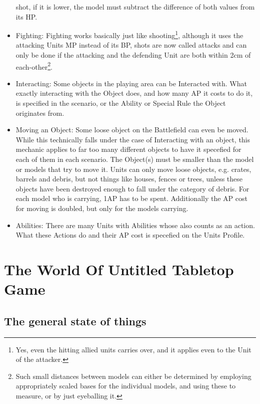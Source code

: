 \documentclass[a4paper,12pt]{report}
\begin{document}
\begin{adjustwidth}{-2cm}{-2cm}
\begin{multicols}{2}
\begin{itemize}
shot, if it is lower, the model must subtract the difference of both values from its HP. 
	\item Fighting: Fighting works basically just like shooting\footnote{Yes, even the hitting allied units carries over, and it applies even to the Unit of the attacker.}, although it uses the attacking Units MP instead of its BP, shots are now called attacks and can only be done if the attacking and the defending Unit are both within 2cm of each-other\footnote{Such small distances between models can either be determined by employing appropriately scaled bases for the individual models, and using these to measure, or by just eyeballing it.}. 
	\item Interacting: Some objects in the playing area can be Interacted with. What exactly interacting with the Object does, and how many AP it costs to do it, is specified in the scenario, or the Ability or Special Rule the Object originates from.
	\item Moving an Object: Some loose object on the Battlefield can even be moved. While this technically falls under the case of Interacting with an object, this mechanic applies to far too many different objects to have it specefied for each of them in each scenario. The Object(s) must be smaller than the model or models that try to move it.  Units can only move loose objects, e.g. crates, barrels and debris, but not things like houses, fences or trees, unless these objects have been destroyed enough to fall under the category of debris.  For each model who is carrying, 1AP has to be spent. Additionally the AP cost for moving is doubled, but only for the models carrying.
	\item Abilities: There are many Units with Abilities whose also counts as an action. What these Actions do and their AP cost is specefied on the Units Profile.

	
\end{itemize}
\end{multicols}
\end{adjustwidth}


\pagebreak

\chapter{The World Of Untitled Tabletop Game}

\section{The general state of things}
\end{document}
